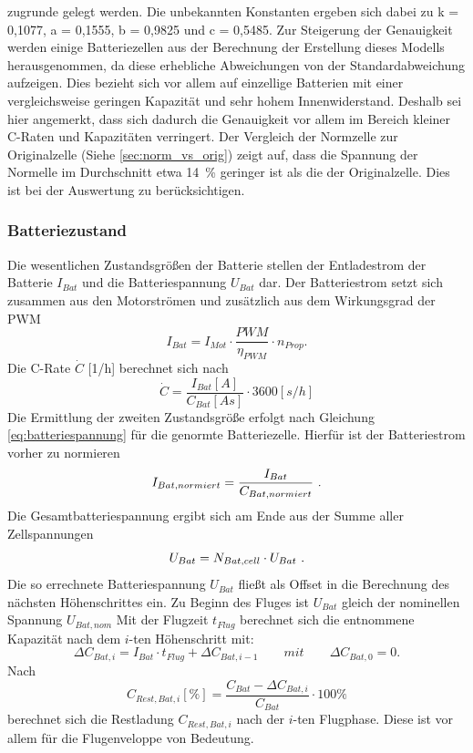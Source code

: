 zugrunde gelegt werden. 
Die unbekannten Konstanten ergeben sich dabei zu k = 0,1077, a = 0,1555, b = 0,9825 und c = 0,5485. Zur Steigerung der Genauigkeit werden einige Batteriezellen aus der Berechnung der Erstellung dieses Modells herausgenommen, da diese erhebliche Abweichungen von der Standardabweichung aufzeigen. Dies bezieht sich vor allem auf einzellige Batterien mit einer vergleichsweise geringen Kapazität und sehr hohem Innenwiderstand. Deshalb sei hier angemerkt, dass sich dadurch die Genauigkeit vor allem im Bereich kleiner C-Raten und Kapazitäten verringert.
Der Vergleich der Normzelle zur Originalzelle (Siehe \ref{sec:norm_vs_orig}) zeigt auf, dass die Spannung der Normelle im Durchschnitt etwa \SI{14}{\%} geringer ist als die der Originalzelle. Dies ist bei der Auswertung zu berücksichtigen.


\subsubsection{Batteriezustand}
Die wesentlichen Zustandsgrößen der Batterie stellen der Entladestrom der Batterie \ensuremath{I_{Bat}} und die Batteriespannung \ensuremath{U_{Bat}} dar. Der Batteriestrom setzt sich zusammen aus den Motorströmen und zusätzlich aus dem Wirkungsgrad der PWM
\begin{equation}
	I_{Bat} = I_{Mot}\cdot \frac{PWM}{\eta_{PWM}}\cdot n_{Prop}.  \label{eq:batteriestrom}
\end{equation}
Die C-Rate \ensuremath{\dot{C}} [1/h] berechnet sich nach 
\begin{equation}
	\dot{C} = \frac{I_{Bat}[A]}{C_{Bat}[As]}\cdot 3600[s/h]
	\label{eq:c_rate}
\end{equation}
Die Ermittlung der zweiten Zustandsgröße erfolgt nach Gleichung \eqref{eq:batteriespannung} für die genormte Batteriezelle. Hierfür ist der Batteriestrom vorher zu normieren
\begin{equation}
	I_{Bat,normiert} = \frac{I_{Bat}}{C_{Bat,normiert}} ~\text{.}
\end{equation}
Die Gesamtbatteriespannung ergibt sich am Ende aus der Summe aller Zellspannungen
\begin{equation}
	U_{Bat} = N_{Bat,cell}\cdot U_{Bat} ~\text{.}
\end{equation}
Die so errechnete Batteriespannung \ensuremath{U_{Bat}} fließt als Offset in die Berechnung des nächsten Höhenschrittes ein. Zu Beginn des Fluges ist \ensuremath{U_{Bat}} gleich der nominellen Spannung \ensuremath{U_{Bat,nom}}
Mit der Flugzeit \ensuremath{t_{Flug}} berechnet sich die entnommene Kapazität nach dem \ensuremath{i}-ten Höhenschritt mit: 
\begin{equation}
	\Delta C_{Bat,i} = I_{Bat}\cdot t_{Flug} + \Delta C_{Bat,i-1} 
	\qquad mit \qquad \Delta C_{Bat,0} = 0.
\end{equation}
Nach
\begin{equation}
	C_{Rest,Bat,i}[\%] = \frac{C_{Bat}-\Delta C_{Bat,i}}{C_{Bat}}\cdot 100\%
\end{equation}
berechnet sich die Restladung \ensuremath{C_{Rest,Bat,i}} nach der \ensuremath{i}-ten Flugphase. Diese ist vor allem für die Flugenveloppe von Bedeutung.\\



